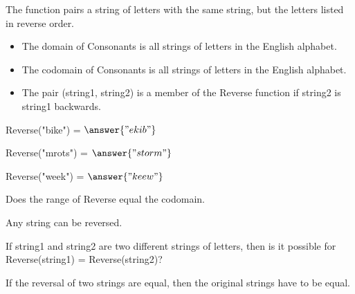 \documentclass{ximera}
\begin{document}
\begin{definition}
  The function  pairs a string of letters with the same string, but the letters listed in reverse order.
 
    \begin{itemize}
    \item The domain of Consonants is all strings of letters in the English alphabet.
    \item The codomain of Consonants is all strings of letters in the English alphabet.
    \item The pair (string1, string2) is a member of the Reverse function if string2 is string1 backwards.
    \end{itemize}

  
\end{definition}



\begin{exercise}
Reverse("bike") = $\answer{"ekib"}$
\end{exercise}


\begin{exercise}
Reverse("mrots") = $\answer{"storm"}$
\end{exercise}


\begin{exercise}
Reverse("week") = $\answer{"keew"}$
\end{exercise}








\begin{exercise}

Does the range of Reverse equal the codomain.

  \begin{multipleChoice}
  \end{multipleChoice}
  \begin{feedback}
Any string can be reversed.
  \end{feedback}
\end{exercise}




\begin{exercise}

If string1 and string2 are two different strings of letters, then is it possible for Reverse(string1) = Reverse(string2)?

  \begin{multipleChoice}
  \end{multipleChoice}
  \begin{feedback}
If the reversal of two strings are equal, then the original strings have to be equal.
  \end{feedback}
\end{exercise}
\end{document}
